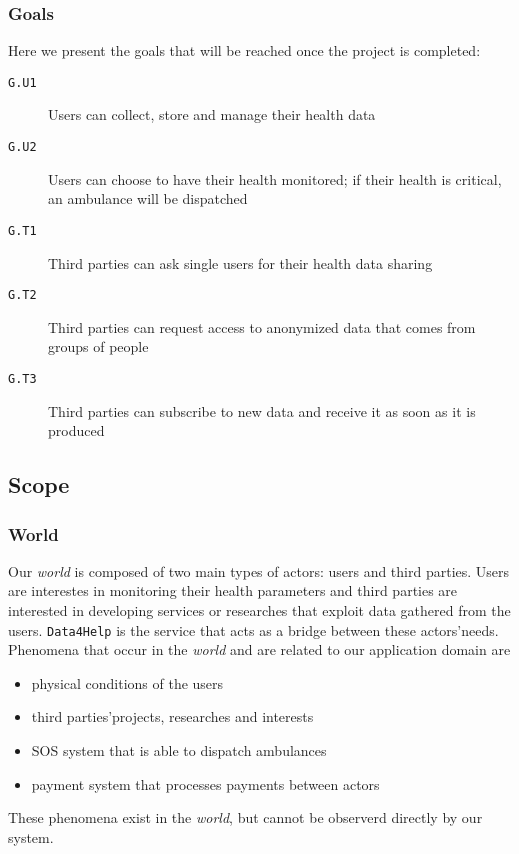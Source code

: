       \subsubsection{Goals}
      \label{sec:goals}

        Here we present the goals that will be reached once the project is completed:

        \begin{description}
          \item[\texttt{G.U1}] Users can collect, store and manage their health data
          \item[\texttt{G.U2}] Users can choose to have their health monitored; if their health is critical, an ambulance will be dispatched
          \item[\texttt{G.T1}] Third parties can ask single users for their health data sharing
          \item[\texttt{G.T2}] Third parties can request access to anonymized data that comes from groups of people
          \item[\texttt{G.T3}] Third parties can subscribe to new data and receive it as soon as it is produced
        \end{description}

  \subsection{Scope}

    \subsubsection{World}

      Our \textit{world} is composed of two main types of actors: users and third parties. Users are interestes in monitoring their health parameters and third parties are interested in developing services or researches that exploit data gathered from the users. \texttt{Data4Help} is the service that acts as a bridge between these actors'needs. \\
      Phenomena that occur in the \textit{world} and are related to our application domain are
      \begin{itemize}
        \item physical conditions of the users
        \item third parties'projects, researches and interests
        \item SOS system that is able to dispatch ambulances
        \item payment system that processes payments between actors
      \end{itemize}
      These phenomena exist in the \textit{world}, but cannot be observerd directly by our system.

